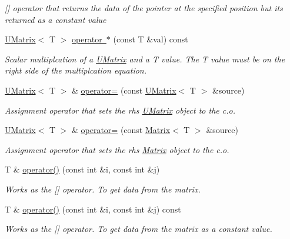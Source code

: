 \begin{DoxyCompactItemize}
\begin{DoxyCompactList}\small\item\em \mbox{[}\mbox{]} operator that returns the data of the pointer at the specified position but its returned as a constant value \end{DoxyCompactList}\item 
\mbox{\hyperlink{class_u_matrix}{U\+Matrix}}$<$ T $>$ \mbox{\hyperlink{class_u_matrix_a7b1875cfc49b374875dac2a58948f3ac}{operator $\ast$}} (const T \&val) const
\begin{DoxyCompactList}\small\item\em Scalar multiplcation of a \mbox{\hyperlink{class_u_matrix}{U\+Matrix}} and a T value. The T value must be on the right side of the multiplcation equation. \end{DoxyCompactList}\item 
\mbox{\hyperlink{class_u_matrix}{U\+Matrix}}$<$ T $>$ \& \mbox{\hyperlink{class_u_matrix_a3f12f4544a460dd93dac8a883654310f}{operator=}} (const \mbox{\hyperlink{class_u_matrix}{U\+Matrix}}$<$ T $>$ \&source)
\begin{DoxyCompactList}\small\item\em Assignment operator that sets the rhs \mbox{\hyperlink{class_u_matrix}{U\+Matrix}} object to the c.\+o. \end{DoxyCompactList}\item 
\mbox{\hyperlink{class_u_matrix}{U\+Matrix}}$<$ T $>$ \& \mbox{\hyperlink{class_u_matrix_a98d77665ae6c6dd8c264d7aca57d76fd}{operator=}} (const \mbox{\hyperlink{class_matrix}{Matrix}}$<$ T $>$ \&source)
\begin{DoxyCompactList}\small\item\em Assignment operator that sets the rhs \mbox{\hyperlink{class_matrix}{Matrix}} object to the c.\+o. \end{DoxyCompactList}\item 
T \& \mbox{\hyperlink{class_u_matrix_a06c554ab9d6deb7d1950cdd49eb089e0}{operator()}} (const int \&i, const int \&j)
\begin{DoxyCompactList}\small\item\em Works as the \mbox{[}\mbox{]} operator. To get data from the matrix. \end{DoxyCompactList}\item 
T \& \mbox{\hyperlink{class_u_matrix_a2fbb6915ab1a6bb7a8944b51600b6d2d}{operator()}} (const int \&i, const int \&j) const
\begin{DoxyCompactList}\small\item\em Works as the \mbox{[}\mbox{]} operator. To get data from the matrix as a constant value. \end{DoxyCompactList}\item 

\end{DoxyCompactItemize}
